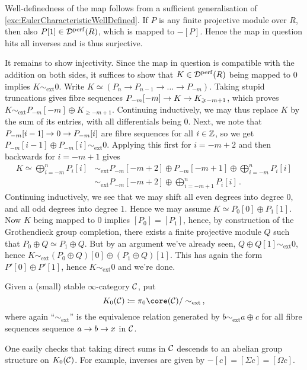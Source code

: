 \documentclass[a4paper, 10pt, oneside, DIV=9, chapterprefix=true, numbers=enddot,bibliography=totoc]{scrbook}
\begin{document}
\begin{proof*}
	Well-definedness of the map follows from a sufficient generalisation of \cref{exc:EulerCharacteristicWellDefined}. If $P$ is any finite projective module over $R$, then also $P[1]\in \mathcal{D}^{\mathrm{perf}}(R)$, which is mapped to $-[P]$. Hence the map in question hits all inverses and is thus surjective. 
	
	It remains to show injectivity. Since the map in question is compatible with the addition on both sides, it suffices to show that $K\in \mathcal{D}^{\mathrm{perf}}(R)$ being mapped to $0$ implies $K\sim_{\mathrm{ext}}0$. Write $K\simeq (P_n\rightarrow P_{n-1}\rightarrow \dotso \rightarrow P_{-m})$. Taking stupid truncations gives fibre sequences $P_{-m}[-m]\morphism K\morphism K_{\geq -m+1}$, which proves $K\sim_{\mathrm{ext}} P_{-m}[-m]\oplus K_{\geq -m+1}$. Continuing inductively, we may thus replace $K$ by the sum of its entries, with all differentials being $0$. Next, we note that $P_{-m}[i-1]\morphism 0 \morphism P_{-m}[i]$ are fibre sequences for all $i\in\mathbb{Z}$, so we get $P_{-m}[i-1]\oplus P_{-m}[i]\sim_{\mathrm{ext}}0$. Applying this first for $i=-m+2$ and then backwards for $i=-m+1$ gives
	\begin{align*}
		K\simeq \bigoplus_{i=-m}^nP_{i}[i]&\sim_\mathrm{ext} P_{-m}[-m+2]\oplus P_{-m}[-m+1]\oplus\bigoplus_{i=-m}^nP_{i}[i]\\
		&\sim_{\mathrm{ext}} P_{-m}[-m+2]\oplus \bigoplus_{i=-m+1}^nP_{i}[i]\,.
	\end{align*}
	Continuing inductively, we see that we may shift all even degrees into degree $0$, and all odd degrees into degree $1$. Hence we may assume $K\simeq P_0[0]\oplus P_1[1]$. Now $K$ being mapped to $0$ implies $[P_0]=[P_1]$, hence, by construction of the Grothendieck group completion, there exists a finite projective module $Q$ such that $P_0\oplus Q\simeq P_1\oplus Q$. But by an argument we've already seen, $Q\oplus Q[1]\sim_{\mathrm{ext}}0$, hence $K\sim_{\mathrm{ext}} (P_0\oplus Q)[0]\oplus (P_1\oplus Q)[1]$. This has again the form $P'[0]\oplus P'[1]$, hence $K\sim_{\mathrm{ext}} 0$ and we're done.
\end{proof*}
\begin{defi}
	Given a (small) stable $\infty$-category $\mathcal{C}$, put
	\begin{equation*}
		K_0(\Cc)\coloneqq \pi_0\core(\Cc)/\sim_{\mathrm{ext}}\,,
	\end{equation*}
	where again \enquote{$\sim_\mathrm{ext}$} is the equivalence relation generated by $b\sim_{\mathrm{ext}} a\oplus c$ for all fibre sequences sequence $a\morphism b\morphism x$ in $\mathcal{C}$.
\end{defi}
One easily checks that taking direct sums in $\mathcal{C}$ descends to an abelian group structure on $K_0(\mathcal{C})$. For example, inverses are given by $-[c]=[\Sigma c]=[\Omega c]$.
\end{document}
